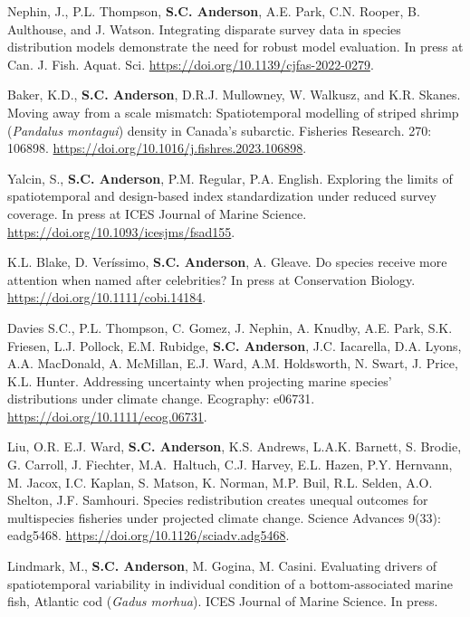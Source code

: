 \begin{description}
\tightlist
\item[2023]
Nephin, J., P.L. Thompson, \textbf{S.C. Anderson}, A.E. Park, C.N.
Rooper, B. Aulthouse, and J. Watson. Integrating disparate survey data
in species distribution models demonstrate the need for robust model
evaluation. In press at Can. J. Fish. Aquat. Sci.
\url{https://doi.org/10.1139/cjfas-2022-0279}.
\item[2023]
Baker, K.D., \textbf{S.C. Anderson}, D.R.J. Mullowney, W. Walkusz, and
K.R. Skanes. Moving away from a scale mismatch: Spatiotemporal modelling
of striped shrimp (\emph{Pandalus montagui}) density in Canada's
subarctic. Fisheries Research. 270: 106898.
\url{https://doi.org/10.1016/j.fishres.2023.106898}.
\item[2023]
Yalcin, S., \textbf{S.C. Anderson}, P.M. Regular, P.A. English.
Exploring the limits of spatiotemporal and design-based index
standardization under reduced survey coverage. In press at ICES Journal
of Marine Science. \url{https://doi.org/10.1093/icesjms/fsad155}.
\item[2023]
K.L. Blake, D. Veríssimo, \textbf{S.C. Anderson}, A. Gleave. Do species
receive more attention when named after celebrities? In press at
Conservation Biology. \url{https://doi.org/10.1111/cobi.14184}.
\item[2023]
Davies S.C., P.L. Thompson, C. Gomez, J. Nephin, A. Knudby, A.E. Park,
S.K. Friesen, L.J. Pollock, E.M. Rubidge, \textbf{S.C. Anderson}, J.C.
Iacarella, D.A. Lyons, A.A. MacDonald, A. McMillan, E.J. Ward, A.M.
Holdsworth, N. Swart, J. Price, K.L. Hunter. Addressing uncertainty when
projecting marine species' distributions under climate change.
Ecography: e06731. \url{https://doi.org/10.1111/ecog.06731}.
\item[2023]
Liu, O.R. E.J. Ward, \textbf{S.C. Anderson}, K.S. Andrews, L.A.K.
Barnett, S. Brodie, G. Carroll, J. Fiechter, M.A.\ Haltuch, C.J. Harvey,
E.L. Hazen, P.Y. Hernvann, M. Jacox, I.C. Kaplan, S. Matson, K. Norman,
M.P. Buil, R.L. Selden, A.O. Shelton, J.F. Samhouri. Species
redistribution creates unequal outcomes for multispecies fisheries under
projected climate change. Science Advances 9(33): eadg5468.
\url{https://doi.org/10.1126/sciadv.adg5468}.
\item[2023]
Lindmark, M., \textbf{S.C. Anderson}, M. Gogina, M. Casini. Evaluating
drivers of spatiotemporal variability in individual condition of a
bottom-associated marine fish, Atlantic cod (\emph{Gadus morhua}). ICES
Journal of Marine Science. In press.

\end{description}
